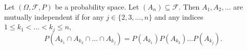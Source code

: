 \documentclass[class=article,crop=false]{standalone}
\begin{document}
\begin{defn}
	Let $(\Omega,\mathcal{F},P)$ be a probability space. Let $(A_n) \subseteq \mathcal{F}$. Then $A_1,A_2,\ldots$ are mutually independent if for any $j \in \{2,3,\ldots,n\} $ and any indices $1\leq k_1 < \ldots < k_j \leq n$,
	\[
		P(A_{k_1} \cap A_{k_2} \cap \ldots \cap A_{k_j}) = P(A_{k_1}) P(A_{k_2}) \ldots P(A_{k_j})
	.\] 
\end{defn}
\end{document}
